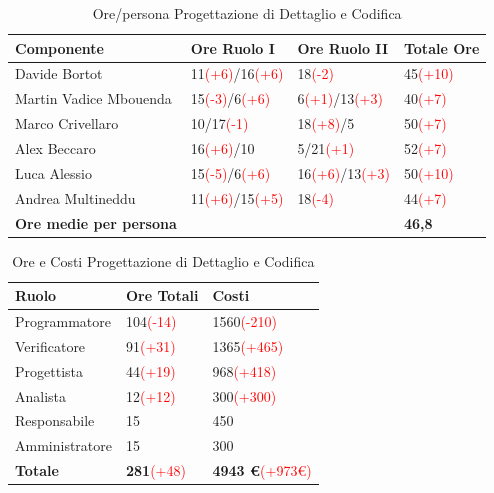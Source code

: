 \documentclass[a4paper,11pt]{article}
\begin{document}
		\begin{table}[h!]			
		\begin{center}
			\begin{tabular}{l l l l}
			\textbf{Componente} & \textbf{Ore Ruolo I} & \textbf{Ore Ruolo II} & \textbf{Totale Ore}\\
			\midrule
			Davide Bortot & 11\textcolor{red}{(+6)}/16\textcolor{red}{(+6)} & 18\textcolor{red}{(-2)} & 45\textcolor{red}{(+10)}\\
			Martin Vadice Mbouenda & 15\textcolor{red}{(-3)}/6\textcolor{red}{(+6)} & 6\textcolor{red}{(+1)}/13\textcolor{red}{(+3)} & 40\textcolor{red}{(+7)}\\
			Marco Crivellaro & 10/17\textcolor{red}{(-1)} & 18\textcolor{red}{(+8)}/5 & 50\textcolor{red}{(+7)} \\
			Alex Beccaro & 16\textcolor{red}{(+6)}/10 & 5/21\textcolor{red}{(+1)} & 52\textcolor{red}{(+7)}\\
			Luca Alessio & 15\textcolor{red}{(-5)}/6\textcolor{red}{(+6)} & 16\textcolor{red}{(+6)}/13\textcolor{red}{(+3)} & 50\textcolor{red}{(+10)}\\
			Andrea Multineddu & 11\textcolor{red}{(+6)}/15\textcolor{red}{(+5)} & 18\textcolor{red}{(-4)} & 44\textcolor{red}{(+7)}\\
			\midrule
			\textbf{Ore medie per persona} & & & \textbf{46,8}\\
			\end{tabular}
		\end{center}
		\caption{Ore/persona Progettazione di Dettaglio e Codifica}
		\end{table}
		\begin{table}[h!]			
		\begin{center}
			\begin{tabular}{l l l}
			\textbf{Ruolo} & \textbf{Ore Totali} & \textbf{Costi}\\
			\midrule
			Programmatore & 104\textcolor{red}{(-14)} & 1560\textcolor{red}{(-210)} \\
			Verificatore & 91\textcolor{red}{(+31)} & 1365\textcolor{red}{(+465)}\\
			Progettista & 44\textcolor{red}{(+19)} & 968\textcolor{red}{(+418)}\\
			Analista & 12\textcolor{red}{(+12)} & 300\textcolor{red}{(+300)}\\		
			Responsabile & 15 & 450\\
			Amministratore & 15 & 300\\
			\midrule
			\textbf{Totale} & \textbf{281}\textcolor{red}{(+48)} & \textbf{4943 \euro}\textcolor{red}{(+973\euro)}\\
			\end{tabular}
		\end{center}
		\caption{Ore e Costi Progettazione di Dettaglio e Codifica}
		\end{table}
		\clearpage
		
\end{document}
